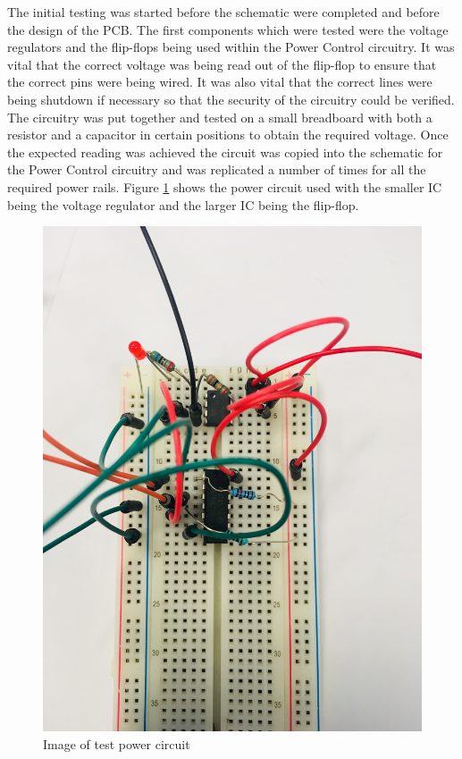 The initial testing was started before the schematic were completed and before the design of the PCB. The first components which were tested were the voltage regulators and the flip-flops being used within the Power Control circuitry. It was vital that the correct voltage was being read out of the flip-flop to ensure that the correct pins were being wired. It was also vital that the correct lines were being shutdown if necessary so that the security of the circuitry could be verified. The circuitry was put together and tested on a small breadboard with both a resistor and a capacitor in certain positions to obtain the required voltage. Once the expected reading was achieved the circuit was copied into the schematic for the Power Control circuitry and was replicated a number of times for all the required power rails. Figure \ref{fig:power_circuit} shows the power circuit used with the smaller IC being the voltage regulator and the larger IC being the flip-flop.

\begin{figure}
	\includegraphics[width=0.5\linewidth]{Figures/powercircuit.jpg}\centering
	\caption{Image of test power circuit}
	\label{fig:power_circuit}
\end{figure}




